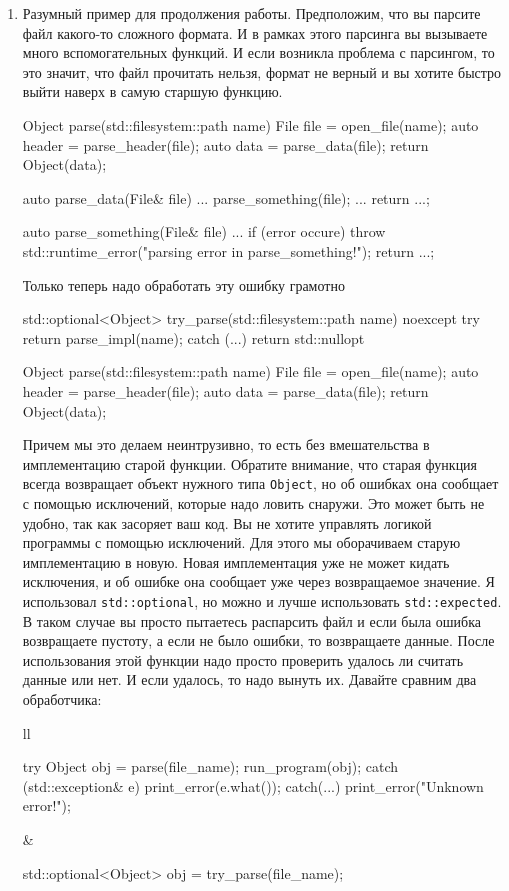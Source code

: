 \begin{enumerate}
\item
\label{item::example::ExceptionLive}
Разумный пример для продолжения работы.
Предположим, что вы парсите файл какого-то сложного формата.
И в рамках этого парсинга вы вызываете много вспомогательных функций.
И если возникла проблема с парсингом, то это значит, что файл прочитать нельзя, формат не верный и вы хотите быстро выйти наверх в самую старшую функцию.
\begin{cppcode}
Object parse(std::filesystem::path name) {
  File file = open_file(name);
  auto header = parse_header(file);
  auto data = parse_data(file);
  return Object(data);
}

auto parse_data(File& file) {
  ...
  parse_something(file);
  ...
  return ...;
}

auto  parse_something(File& file) {
  ...
  if (error occure)
    throw std::runtime_error("parsing error in parse_something!");
  return ...;
}
\end{cppcode}
Только теперь надо обработать эту ошибку грамотно
\begin{cppcode}
std::optional<Object> try_parse(std::filesystem::path name) noexcept {
  try {
    return parse_impl(name);
  } catch (...) {
    return std::nullopt
  }
}

Object parse(std::filesystem::path name) {
  File file = open_file(name);
  auto header = parse_header(file);
  auto data = parse_data(file);
  return Object(data);
}
\end{cppcode}
Причем мы это делаем неинтрузивно, то есть без вмешательства в имплементацию старой функции.
Обратите внимание, что старая функция всегда возвращает объект нужного типа \verb"Object", но об ошибках она сообщает с помощью исключений, которые надо ловить снаружи.
Это может быть не удобно, так как засоряет ваш код.
Вы не хотите управлять логикой программы с помощью исключений.
Для этого мы оборачиваем старую имплементацию в новую.
Новая имплементация уже не может кидать исключения, и об ошибке она сообщает уже через возвращаемое значение.
Я использовал \verb"std::optional", но можно и лучше использовать \verb"std::expected".
В таком случае вы просто пытаетесь распарсить файл и если была ошибка возвращаете пустоту, а если не было ошибки, то возвращаете данные.
После использования этой функции надо просто проверить удалось ли считать данные или нет.
И если удалось, то надо вынуть их.
Давайте сравним два обработчика:
\begin{center}
\begin{tabular}{ll}
{
\begin{minipage}[\baselineskip]{8cm}
\begin{cppcode}[numbers = none]
try {
  Object obj = parse(file_name);
  run_program(obj);
} catch (std::exception& e) {
  print_error(e.what());
} catch(...) {
  print_error("Unknown error!");
}
\end{cppcode}
\end{minipage}
}&{
\begin{minipage}[\baselineskip]{8cm}
\begin{cppcode}[numbers = none]
std::optional<Object> obj =
                   try_parse(file_name);


\end{cppcode}
\end{minipage}}
\end{tabular}
\end{center}
\end{enumerate}
